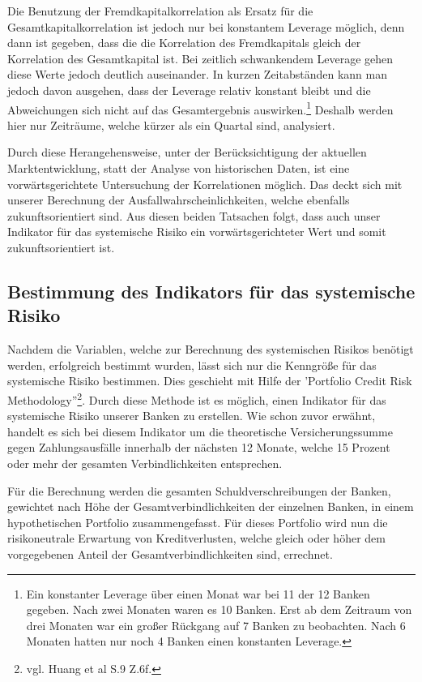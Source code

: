 \documentclass[a4paper,12pt]{scrartcl}
\begin{document}
Die Benutzung der Fremdkapitalkorrelation als Ersatz für die Gesamtkapitalkorrelation ist jedoch nur bei konstantem Leverage möglich, denn dann ist gegeben, dass die die Korrelation des Fremdkapitals gleich der Korrelation des Gesamtkapital ist. Bei zeitlich schwankendem Leverage gehen diese Werte jedoch deutlich auseinander. 
In kurzen Zeitabständen kann man jedoch davon ausgehen, dass der Leverage relativ konstant bleibt und die Abweichungen sich nicht auf das Gesamtergebnis auswirken.\footnote{Ein konstanter Leverage über einen Monat war bei 11 der 12 Banken gegeben. Nach zwei Monaten waren es 10 Banken. Erst ab dem Zeitraum von drei Monaten war ein großer Rückgang auf 7 Banken zu beobachten. Nach 6 Monaten hatten nur noch 4 Banken einen konstanten Leverage.}
Deshalb werden hier nur Zeiträume, welche kürzer als ein Quartal sind, analysiert. 


Durch diese Herangehensweise, unter der Berücksichtigung der aktuellen Marktentwicklung, statt der Analyse von historischen Daten, ist eine vorwärtsgerichtete Untersuchung der Korrelationen möglich. Das deckt sich mit unserer Berechnung der Ausfallwahrscheinlichkeiten, welche ebenfalls zukunftsorientiert sind. Aus diesen beiden Tatsachen folgt, dass auch unser Indikator für das systemische Risiko ein vorwärtsgerichteter Wert und somit zukunftsorientiert ist. 

\subsection{Bestimmung des Indikators für das systemische Risiko}
Nachdem die Variablen, welche zur Berechnung des systemischen Risikos benötigt werden, erfolgreich bestimmt wurden, lässt sich nur die Kenngröße für das systemische Risiko bestimmen. Dies geschieht mit Hilfe der 'Portfolio Credit Risk Methodology''\footnote{vgl. Huang et al S.9 Z.6f.}. Durch diese Methode ist es möglich, einen Indikator für das systemische Risiko unserer Banken zu erstellen. Wie schon zuvor erwähnt, handelt es sich bei diesem Indikator um die theoretische Versicherungssumme gegen Zahlungsausfälle innerhalb der nächsten 12 Monate, welche 15 Prozent oder mehr der gesamten Verbindlichkeiten entsprechen.

Für die Berechnung werden die gesamten Schuldverschreibungen der Banken, gewichtet nach Höhe der Gesamtverbindlichkeiten der einzelnen Banken, in einem hypothetischen Portfolio zusammengefasst. Für dieses Portfolio wird nun die risikoneutrale Erwartung von Kreditverlusten, welche gleich oder höher dem vorgegebenen Anteil der Gesamtverbindlichkeiten sind, errechnet.
\end{document}
